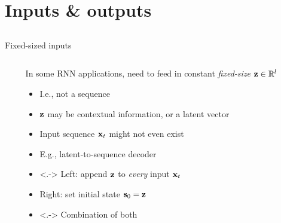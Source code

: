 \section{Inputs \& outputs}
\subsection{}

\begin{frame}{Fixed-sized inputs}
    \begin{columns}
        \begin{column}{0.15\textwidth}
        \end{column}
        \begin{column}{0.41\textwidth}
            In some RNN{} applications, need to feed in constant \emph{fixed-size} $\mathbf{z} \in \mathbb{R}^l$
            \begin{itemize}
                \item<+-> I.e., not a sequence
                \item $\mathbf{z}$ may be contextual information, or a latent vector
                \item Input sequence $\mathbf{x}_t$ might not even exist
                \item E.g., latent-to-sequence decoder
            \end{itemize}
            \begin{itemize}
                \item<.-> Left: append $\mathbf{z}$ to \emph{every} input $\mathbf{x}_t$
                \item<+-> Right: set initial state $\mathbf{s}_0 = \mathbf{z}$
                \item<.-> Combination of both
            \end{itemize}
        \end{column}
        \begin{column}{0.44\textwidth}
            \vspace{-4mm}
        \end{column}
    \end{columns}
\end{frame}

